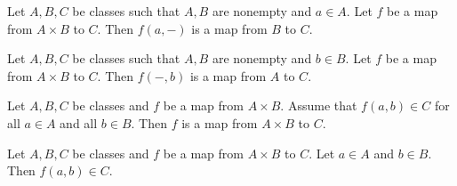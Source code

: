 \documentclass[../../set-theory/set-theory.tex]{subfiles}
\begin{document}
  \begin{forthel}
    \begin{proposition}
      Let $A, B, C$ be classes such that $A, B$ are nonempty and $a \in A$.
      Let $f$ be a map from $A \times B$ to $C$.
      Then $f(a,-)$ is a map from $B$ to $C$.
    \end{proposition}
  \end{forthel}

  \begin{forthel}
    \begin{proposition}
      Let $A, B, C$ be classes such that $A, B$ are nonempty and $b \in B$.
      Let $f$ be a map from $A \times B$ to $C$.
      Then $f(-,b)$ is a map from $A$ to $C$.
    \end{proposition}
  \end{forthel}

  \begin{forthel}
    \begin{proposition}
      Let $A, B, C$ be classes and $f$ be a map from $A \times B$.
      Assume that $f(a,b) \in C$ for all $a \in A$ and all $b \in B$.
      Then $f$ is a map from $A \times B$ to $C$.
    \end{proposition}
  \end{forthel}

  \begin{forthel}
    \begin{proposition}
      Let $A, B, C$ be classes and $f$ be a map from $A \times B$ to $C$.
      Let $a \in A$ and $b \in B$.
      Then $f(a,b) \in C$.
    \end{proposition}
  \end{forthel}
\end{document}
